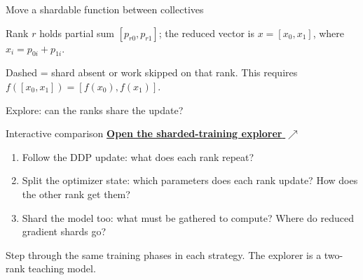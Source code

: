 \documentclass[handout]{beamer}
\begin{document}
\begin{frame}{Move a shardable function between collectives}
  \par\vspace{4pt}
  \footnotesize Rank $r$ holds partial sum $[p_{r0},p_{r1}]$; the reduced vector is $x=[x_0,x_1]$, where $x_i=p_{0i}+p_{1i}$.
  \par\vspace{3pt}
  \footnotesize Dashed = shard absent or work skipped on that rank. This requires $f([x_0,x_1])=[f(x_0),f(x_1)]$.
\end{frame}

\begin{frame}{Explore: can the ranks share the update?}
  \begin{block}{Interactive comparison}
    \href{https://brain-bzh.github.io/llm-course/demos/fsdp-discovery.html}{\textbf{Open the sharded-training explorer} $\nearrow$}
  \end{block}
  \begin{enumerate}
      \setlength{\itemsep}{7pt}
    \item Follow the DDP update: what does each rank repeat?
    \item Split the optimizer state: which parameters does each rank update? How does the other rank get them?
    \item Shard the model too: what must be gathered to compute? Where do reduced gradient shards go?
  \end{enumerate}
  \vfill
  \small Step through the same training phases in each strategy. The explorer is a two-rank teaching model.
\end{frame}
\end{document}
